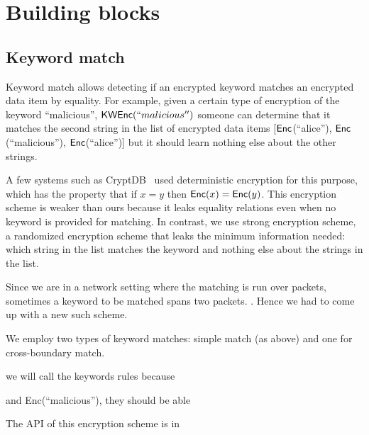 


\section{Building blocks}


\subsection{Keyword match}

%

Keyword match allows detecting if an encrypted keyword matches an encrypted data item by equality.
For example, given a certain type of encryption of the keyword ``malicious'', $\mathsf{KWEnc}(``malicious'')$ someone can determine that it matches the second string in the list of encrypted data items [$\mathsf{Enc}$(``alice''), $\mathsf{Enc}$(``malicious''), $\mathsf{Enc}$(``alice'')] but it should learn nothing else about the other strings.

A few systems such as CryptDB~\cite{cryptdb, someother} used deterministic encryption for this purpose, which has the property that if $x = y$ then $\mathsf{Enc}(x) = \mathsf{Enc}(y)$. This encryption scheme is weaker than ours because it leaks equality relations even when no keyword is provided for matching. In contrast, we use strong encryption scheme, a randomized encryption scheme that leaks the minimum information needed: which string in the list matches the keyword and nothing else about the strings in the list. 

Since we are in a network setting where the matching is run over packets, sometimes a keyword to be matched spans two packets. . Hence we had to come up with a new such scheme. 

We employ two types of keyword matches: simple match (as above) and one for cross-boundary match. 


we will call the keywords rules because 

 and Enc(``malicious''), they should be able 

The API of this encryption scheme is in 


